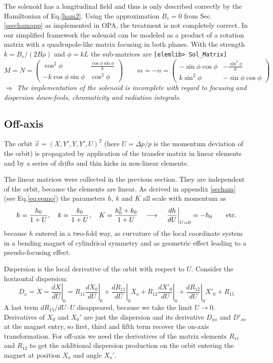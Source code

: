 \documentclass[12pt]{article}
\newcommand\beq{\begin{equation}}
\newcommand\eeq{\end{equation}}
\newcommand\todo[1]{$\Longrightarrow$ {\em #1} }
\newcommand\code[1]{{\tt [#1]}}
\begin{document}
The solenoid has a longitudinal field and thus is only described correctly by the Hamiltonian of Eq.\ref{ham2}. Using the approximation $B_s=0$ from Sec.\ref{ssechamapp} as implemented in OPA, the treatment is not completely correct. In our simplified framework the solenoid can be modeled as a product of a rotation matrix with a quadrupole-like matrix focusing in both planes.
With the strength $k= B_s/(2 B\rho)$ and $\phi=kL$ the sub-matrices are \code{elemlib> Sol\_Matrix}
\beq
M=N=\left( \begin{array}{cc} \cos^2\phi & \frac{\cos\phi\sin\phi}{k} \\
-k \cos\phi\sin\phi & \cos^2\phi \end{array} \right)\qquad
m=-n = \left( \begin{array}{cc} -\sin\phi\cos\phi & -\frac{\sin^2\phi}{k} \\
k \sin^2\phi & -\sin\phi\cos\phi \end{array} \right)
\eeq
\todo{The implementation of the solenoid is incomplete with regard to focusing and dispersion down-feeds, chromaticity and radiation integrals.}


\subsection{Off-axis}
The orbit $\vec{x}=(X, Y', Y, Y',U)^T$ (here $U=\Delta p/p$ is the momentum deviation of the orbit) is propagated by application of the transfer matrix in linear elements and by a series of drifts and thin kicks in non-linear elements.

The linear matrices were collected in the previous section. They are independent of the orbit, because the elements are linear. As derived in appendix \ref{secham} (see Eq.\ref{eq:eqmo}) the parameters $h$, $k$ and $K$ all scale with momentum as
\beq
h=\frac{h_0}{1+U}, \quad k=\frac{k_0}{1+U}, \quad K=\frac{h_0^2+k_0}{1+U}
\quad\longrightarrow\quad
\left. \frac{dh}{dU}\right|_{U=0} = -h_0\qquad
\mbox{\rm etc.}
\eeq
because $h$ entered in a two-fold way, as curvature of the local coordinate system in a bending magnet of cylindrical symmetry and as geometric effect leading to a pseudo-focusing effect.

Dispersion is the local derivative of the orbit with respect to $U$. Consider the horizontal dispersion:
\[
D_x = \dot X = \left. \frac{dX}{dU}\right|_0 =
\left. R_{11} \frac{dX_0}{dU}\right|_0 +
\left. \frac{d R_{11}}{dU}\right|_0 X_o +
\left. R_{12} \frac{dX'_0}{dU}\right|_0 +
\left. \frac{d R_{12}}{dU}\right|_0 X'_0
+ R_{15}
\]
A last term $dR_{15}/dU\cdot U$ disappeared, because we take the limit $U\rightarrow 0$. Derivatives of $X_0$ and $X_0'$ are just the dispersion and its derivative $D_{xo}$ and $D'_{xo}$ at the magnet entry, so first, third and fifth term recover the on-axis transformation. For off-axis we need the derivatives of the matrix elements $R_{11}$ and $R_{12}$ to get the additional dispersion production on the orbit entering the magnet at position $X_o$ and angle $X_o'$.
\end{document}
